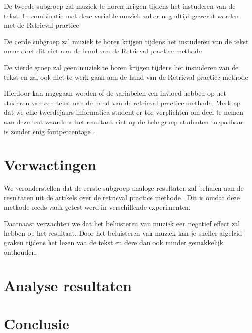 \documentclass{hogent-article}
\begin{document}
	De tweede subgroep zal muziek te horen krijgen tijdens het instuderen van de tekst. In combinatie met deze variable muziek zal er nog altijd gewerkt worden met de Retrieval practice
	
	De derde subgroep zal muziek te horen krijgen tijdens het instuderen van de tekst maar doet dit niet aan de hand van de Retrieval practice methode
	
	De vierde groep zal geen muziek te horen krijgen tijdens het instuderen van de tekst en zal ook niet te werk gaan aan de hand van de Retrieval practice methode
	
	Hierdoor kan nagegaan worden of de variabelen een invloed hebben op het studeren van een tekst aan de hand van de retrieval practice methode. Merk op dat we elke tweedejaars informatica student er toe verplichten om deel te nemen aan deze test waardoor het resultaat niet op de hele groep studenten toepasbaar is zonder enig foutpercentage \autocite{karpicke2009metacognitive}.
	
	\section{Verwactingen}
	We veronderstellen dat de eerste subgroep analoge resultaten zal behalen aan de resultaten uit de artikels over de retrieval practice methode \autocite{butler2010repeated, pyc2012test, karpicke2007repeated, karpicke2008critical}. Dit is omdat deze methode reeds vaak getest werd in verschillende experimenten.
	
	Daarnaast verwachten we dat het beluisteren van muziek een negatief effect zal hebben op het resultaat. Door het beluisteren van muziek kan je sneller afgeleid graken tijdens het lezen van de tekst en deze dan ook minder gemakkelijk onthouden.
	
	\section{Analyse resultaten}
	
	\section{Conclusie}
	
	
	
	
	\printbibliography[heading=bibintoc]
	
\end{document}

